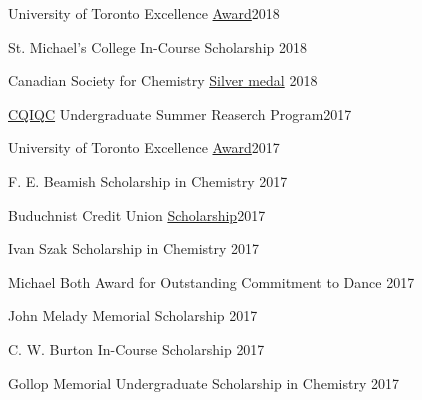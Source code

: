 \documentclass[margin,line]{res}
\begin{document}
\begin{resume}
\vspace*{-2.5mm}

University of Toronto Excellence \href{https://registrar.utoronto.ca/finances-and-funding/utea/}{Award}\hfill{2018}

\vspace*{-2.5mm}

St. Michael's College In-Course Scholarship \hfill {2018}

\vspace*{-2.5mm}

Canadian Society for Chemistry \href{https://www.cheminst.ca/awards/student/} {Silver medal} \hfill{2018} 

\vspace*{-2.5mm}

\href{https://cqiqc.physics.utoronto.ca/cqiqc-programs/undergraduates/}{CQIQC} Undergraduate Summer Reaserch Program\hfill{2017}

\vspace*{-2.5mm}

University of Toronto Excellence \href{https://registrar.utoronto.ca/finances-and-funding/utea/}{Award}\hfill{2017}

\vspace*{-2.5mm}

F. E. Beamish Scholarship in Chemistry \hfill{2017}

\vspace*{-2.5mm}

Buduchnist Credit Union \href{http://www.buduchnist.com/scholarships}{Scholarship}\hfill {2017}

\vspace*{-2.5mm}

Ivan Szak Scholarship in Chemistry \hfill {2017}

\vspace*{-2.5mm}

Michael Both Award for Outstanding Commitment to Dance %
\hfill {2017}

\vspace*{-2.5mm}

John Melady Memorial Scholarship \hfill{2017} 

\vspace*{-2.5mm}

C. W. Burton In-Course Scholarship \hfill{2017} 

\vspace*{-2.5mm}

Gollop Memorial Undergraduate Scholarship in Chemistry \hfill{2017}


\end{resume}
\end{document}
